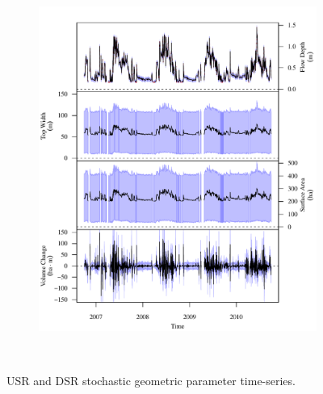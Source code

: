 \begin{linenumbers}
\begin{landscape}
\begin{figure}
\begin{subfigure}{0.7\textwidth}
			\includegraphics[width=\tableCustomSize]{"Figures/Results_USR/Stochastic/G TS D"}
			\label{sub:GeoTS_D}
		\end{subfigure}\\
		\caption{USR and DSR stochastic geometric parameter time-series.}
	\end{figure}
\end{landscape}


\end{linenumbers}

